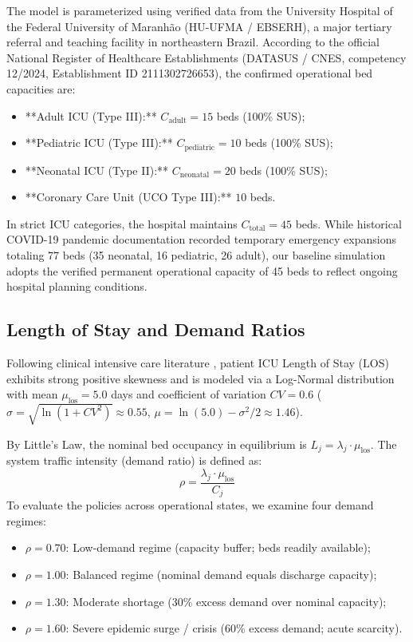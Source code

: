 \documentclass{ro}
\begin{document}
The model is parameterized using verified data from the University Hospital of the Federal University of Maranh\~ao (HU-UFMA / EBSERH), a major tertiary referral and teaching facility in northeastern Brazil. According to the official National Register of Healthcare Establishments (DATASUS / CNES, competency 12/2024, Establishment ID 2111302726653), the confirmed operational bed capacities are:
\begin{itemize}
    \item **Adult ICU (Type III):** $C_{\text{adult}} = 15$ beds (100\% SUS);
    \item **Pediatric ICU (Type III):** $C_{\text{pediatric}} = 10$ beds (100\% SUS);
    \item **Neonatal ICU (Type II):** $C_{\text{neonatal}} = 20$ beds (100\% SUS);
    \item **Coronary Care Unit (UCO Type III):** $10$ beds.
\end{itemize}
In strict ICU categories, the hospital maintains $C_{\text{total}} = 45$ beds. While historical COVID-19 pandemic documentation \cite{huufma} recorded temporary emergency expansions totaling 77 beds (35 neonatal, 16 pediatric, 26 adult), our baseline simulation adopts the verified permanent operational capacity of 45 beds to reflect ongoing hospital planning conditions.

\subsection{Length of Stay and Demand Ratios}

Following clinical intensive care literature \cite{Alban_2020, Valeva_2023, Murray_2023}, patient ICU Length of Stay ($\text{LOS}$) exhibits strong positive skewness and is modeled via a Log-Normal distribution with mean $\mu_{\text{los}} = 5.0$ days and coefficient of variation $CV = 0.6$ ($\sigma = \sqrt{\ln(1 + CV^2)} \approx 0.55$, $\mu = \ln(5.0) - \sigma^2/2 \approx 1.46$).

By Little's Law, the nominal bed occupancy in equilibrium is $L_j = \lambda_j \cdot \mu_{\text{los}}$. The system traffic intensity (demand ratio) is defined as:
\begin{equation}
    \rho = \frac{\lambda_j \cdot \mu_{\text{los}}}{C_j}
\end{equation}
To evaluate the policies across operational states, we examine four demand regimes:
\begin{itemize}
    \item $\rho = 0.70$: Low-demand regime (capacity buffer; beds readily available);
    \item $\rho = 1.00$: Balanced regime (nominal demand equals discharge capacity);
    \item $\rho = 1.30$: Moderate shortage (30\% excess demand over nominal capacity);
    \item $\rho = 1.60$: Severe epidemic surge / crisis (60\% excess demand; acute scarcity).
\end{itemize}
\end{document}
